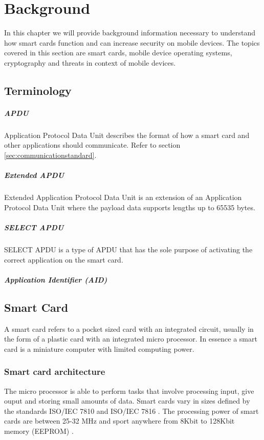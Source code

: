 \chapter{Background}
In this chapter we will provide background information necessary to understand how smart cards function and can increase security on mobile devices. The topics covered in this section are smart cards, mobile device operating systems, cryptography and threats in context of mobile devices.

\section{Terminology}
\paragraph{APDU}
Application Protocol Data Unit describes the format of how a smart card and other applications should communicate. Refer to section \ref{sec:communicationstandard}.

\paragraph{Extended APDU}
Extended Application Protocol Data Unit is an extension of an Application Protocol Data Unit where the payload data supports lengths up to 65535 bytes.

\paragraph{SELECT APDU}
SELECT APDU is a type of APDU that has the sole purpose of activating the correct application on the smart card.

\paragraph{Application Identifier (AID)}

\section{Smart Card}
\label{sec:smartcard}
A smart card refers to a pocket sized card with an integrated circuit, usually in the form of a plastic card with an integrated micro processor. In essence a smart card is a miniature computer with limited computing power.

\subsection{Smart card architecture}
The micro processor is able to perform tasks that involve processing input, give ouput and storing small amounts of data. Smart cards vary in sizes defined by the standards ISO/IEC 7810 \cite{iso7810} and ISO/IEC 7816 \cite{iso7816}. The processing power of smart cards are between 25-32 MHz and sport anywhere from 8Kbit to 128Kbit memory (EEPROM) \cite{cardProcessing}.


